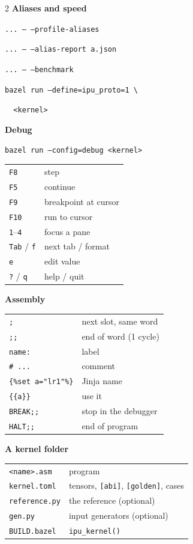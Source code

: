 \documentclass[11pt,a4paper]{article}
\begin{document}
\begin{tcolorbox}[enhanced, colback=white, colframe=muted, boxrule=0.8pt, arc=4pt,
  left=10pt, right=10pt, top=8pt, bottom=6pt]
{\begin{multicols}{2}
\medskip\textbf{\sffamily Aliases and speed}\par
\texttt{... -- --profile-aliases}\par
\texttt{... -- --alias-report a.json}\par
\texttt{... -- --benchmark}\par
\texttt{bazel run --define=ipu\_proto=1 \textbackslash}\par
\texttt{\ \ <kernel>}\par

\columnbreak
\textbf{\sffamily Debug}\par
\texttt{bazel run --config=debug <kernel>}\par\smallskip
\begin{tabular}{@{}ll@{}}
\texttt{F8} & step \\
\texttt{F5} & continue \\
\texttt{F9} & breakpoint at cursor \\
\texttt{F10} & run to cursor \\
\texttt{1}--\texttt{4} & focus a pane \\
\texttt{Tab} / \texttt{f} & next tab / format \\
\texttt{e} & edit value \\
\texttt{?} / \texttt{q} & help / quit \\
\end{tabular}

\medskip\textbf{\sffamily Assembly}\par
\begin{tabular}{@{}ll@{}}
\texttt{;} & next slot, same word \\
\texttt{;;} & end of word (1 cycle) \\
\texttt{name:} & label \\
\texttt{\# ...} & comment \\
\texttt{\{\%set a="lr1"\%\}} & Jinja name \\
\texttt{\{\{a\}\}} & use it \\
\texttt{BREAK;;} & stop in the debugger \\
\texttt{HALT;;} & end of program \\
\end{tabular}

\medskip\textbf{\sffamily A kernel folder}\par
\begin{tabular}{@{}ll@{}}
\texttt{<name>.asm} & program \\
\texttt{kernel.toml} & tensors, \texttt{[abi]}, \texttt{[golden]}, cases \\
\texttt{reference.py} & the reference (optional) \\
\texttt{gen.py} & input generators (optional) \\
\texttt{BUILD.bazel} & \texttt{ipu\_kernel()} \\
\end{tabular}


\end{multicols}}
\end{tcolorbox}
\end{document}
